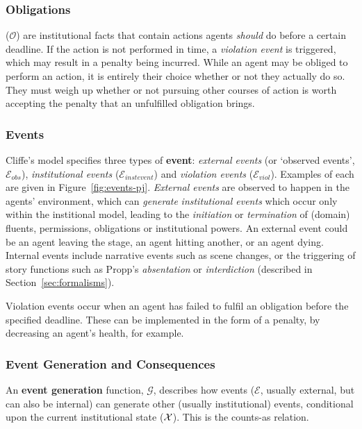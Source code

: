 \documentclass[11pt]{report}
\begin{document}
\subsubsection{Obligations} ($\mathcal{O}$) are institutional facts that contain actions agents \emph{should} do before a certain deadline. If the action is not performed in time, a \emph{violation event} is triggered, which may result in a penalty being incurred. While an agent may be obliged to perform an action, it is entirely their choice whether or not they actually do so. They must weigh up whether or not pursuing other courses of action is worth accepting the penalty that an unfulfilled obligation brings.

\subsubsection{Events}
\label{sec:inst-events}
Cliffe's model specifies three types of \textbf{event}: \emph{external events} (or `observed events', $\mathcal{E}_{obs}$), \emph{institutional events} ($\mathcal{E}_{instevent}$) and \emph{violation events} ($\mathcal{E}_{viol}$). Examples of each are given in Figure~\ref{fig:events-pj}.
\emph{External events} are observed to happen in the agents' environment, which can \emph{generate} \emph{institutional events} which occur only within the institional model, leading to the \emph{initiation} or \emph{termination} of (domain) fluents, permissions, obligations or institutional powers.
An external event could be an agent leaving the stage, an agent hitting another,
or an agent dying. Internal events include narrative events such as scene
changes, or the triggering of story functions such as Propp's \emph{absentation} or \emph{interdiction} (described in Section~\ref{sec:formalisms}). 

Violation events occur when an agent has failed to fulfil an obligation before the specified deadline. These can be implemented in the form of a penalty, by decreasing an agent's health, for example.

\subsubsection{Event Generation and Consequences}
An \textbf{event generation} function, $\mathcal{G}$, describes how events
($\mathcal{E}$, usually external, but can also be internal) %
can generate other (usually institutional) events, conditional upon the current institutional state ($\cal X$). This is the counts-as relation.
\end{document}
